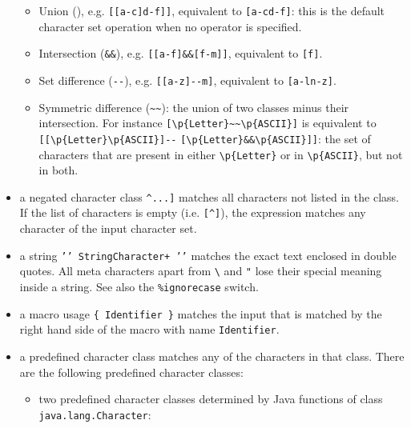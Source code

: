 \begin{itemize}
  \begin{itemize}
  \item
    Union (\texttt{\textbar{}\textbar{}}), e.g.
    \texttt{{[}{[}a-c{]}\textbar{}\textbar{}{[}d-f{]}{]}}, equivalent to
    \texttt{{[}a-cd-f{]}}: this is the default character set operation
    when no operator is specified.
  \item
    Intersection (\texttt{\&\&}), e.g.
    \texttt{{[}{[}a-f{]}\&\&{[}f-m{]}{]}}, equivalent to
    \texttt{{[}f{]}}.
  \item
    Set difference (\texttt{-\/-}), e.g. \texttt{{[}{[}a-z{]}-\/-m{]}},
    equivalent to \texttt{{[}a-ln-z{]}}.
  \item
    Symmetric difference (\texttt{\textasciitilde{}\textasciitilde{}}):
    the union of two classes minus their intersection. For instance
    \texttt{{[}\textbackslash{}p\{Letter\}\textasciitilde{}\textasciitilde{}\textbackslash{}p\{ASCII\}{]}}
    is equivalent to
    \texttt{{[}{[}\textbackslash{}p\{Letter\}\textbar{}\textbar{}\textbackslash{}p\{ASCII\}{]}-\/-}
    \texttt{{[}\textbackslash{}p\{Letter\}\&\&\textbackslash{}p\{ASCII\}{]}{]}}:
    the set of characters that are present in either
    \texttt{\textbackslash{}p\{Letter\}} or in
    \texttt{\textbackslash{}p\{ASCII\}}, but not in both.
  \end{itemize}
\item
  a negated character class
  \texttt{\textquotesingle{}{[}\^{}...{]}\textquotesingle{}} matches all
  characters not listed in the class. If the list of characters is empty
  (i.e. \texttt{{[}\^{}{]}}), the expression matches any character of
  the input character set.
\item
  a string \texttt{’’\ StringCharacter+\ ’’} matches the exact text
  enclosed in double quotes. All meta characters apart from
  \texttt{\textbackslash{}} and \texttt{"} lose their special meaning
  inside a string. See also the \texttt{\%ignorecase} switch.
\item
  a macro usage
  \texttt{\textquotesingle{}\{\textquotesingle{}\ Identifier\ \textquotesingle{}\}\textquotesingle{}}
  matches the input that is matched by the right hand side of the macro
  with name \texttt{Identifier}.
\item
  a predefined character class matches any of the characters in that
  class. There are the following predefined character classes:

  \begin{itemize}
  \item
    two predefined character classes determined by Java functions of
    class \texttt{java.lang.Character}:


\end{itemize}
\end{itemize}
